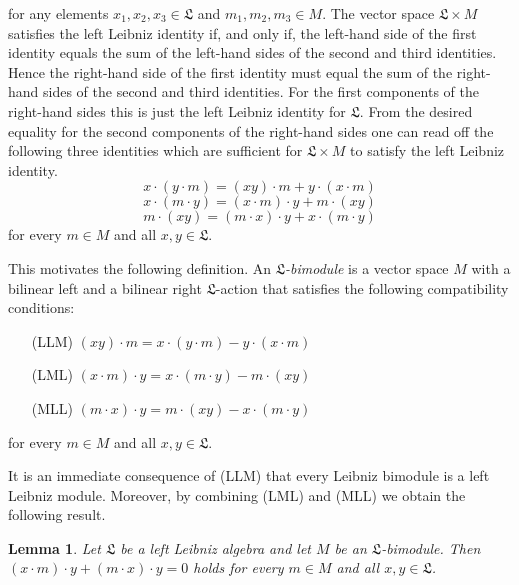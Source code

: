 \documentclass{amsart}
\newtheorem{lem}[thm]{Lemma}
\numberwithin{equation}{section}
\newcommand{\lf}{\mathfrak{L}}
\begin{document}
for any elements $x_1,x_2,x_3\in\lf$ and $m_1,m_2,m_3\in M$. The vector space $\lf\times M$
satisfies the left Leibniz identity if, and only if, the left-hand side of the first identity equals the
sum of the left-hand sides of the second and third identities. Hence the right-hand side of the
first identity must equal the sum of the right-hand sides of the second and third identities. For
the first components of the right-hand sides this is just the left Leibniz identity for $\lf$. From the
desired equality for the second components of the right-hand sides one can read off the following
three identities which are sufficient for $\lf\times M$ to satisfy the left Leibniz identity.
\begin{equation}\label{LLM}
x\cdot(y\cdot m)=(xy)\cdot m+y\cdot(x\cdot m)
\end{equation}
\begin{equation}\label{LML}
x\cdot(m\cdot y)=(x\cdot m)\cdot y+m\cdot(xy)
\end{equation}
\begin{equation}\label{MLL}
m\cdot(xy)=(m\cdot x)\cdot y+x\cdot(m\cdot y)
\end{equation}
for every $m\in M$ and all $x,y\in\lf$.

This motivates the following definition. An {\em $\lf$-bimodule\/} is a vector space $M$ with a
bilinear left and a bilinear right $\lf$-action that satisfies the following compatibility conditions:
\begin{enumerate}
\item[(LLM)] \hspace{2.5cm}$(xy)\cdot m=x\cdot(y\cdot m)-y\cdot(x\cdot m)$
\item[(LML)] \hspace{2.5cm}$(x\cdot m)\cdot y=x\cdot(m\cdot y)-m\cdot(xy)$
\item[(MLL)] \hspace{2.5cm}$(m\cdot x)\cdot y=m\cdot(xy)-x\cdot(m\cdot y)$
\end{enumerate}
for every $m\in M$ and all $x,y\in\lf$.

It is an immediate consequence of (LLM) that every Leibniz bimodule is a left Leibniz module.
Moreover, by combining (LML) and (MLL) we obtain the following result.

\begin{lem}\label{LRRR}
Let $\lf$ be a left Leibniz algebra and let $M$ be an $\lf$-bimodule. Then $(x\cdot m)\cdot
y+(m\cdot x)\cdot y=0$ holds for every $m\in M$ and all $x,y\in\lf$. 
\end{lem}
\end{document}
